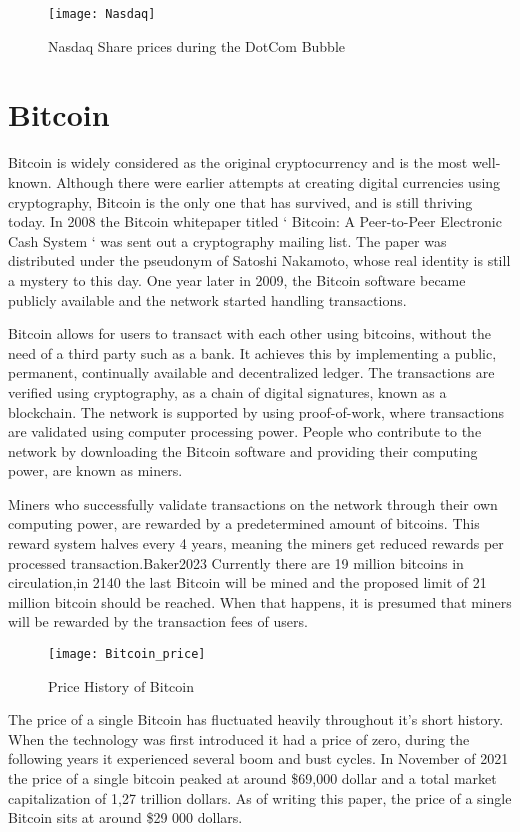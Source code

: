 \begin{figure} [h]
\texttt{[image: Nasdaq]}
\caption{Nasdaq Share prices during the DotCom Bubble}
\autocite{Chisu2018}
\end{figure}

\section{Bitcoin} \bigbreak

Bitcoin is widely considered as the original cryptocurrency and is the most well-known. Although there were earlier attempts at creating digital currencies using cryptography, Bitcoin is the only one that has survived, and is still thriving today. In 2008 the Bitcoin whitepaper titled ‘ Bitcoin: A Peer-to-Peer Electronic Cash System ‘ was sent out a cryptography mailing list. The paper was distributed under the pseudonym of Satoshi Nakamoto, whose real identity is still a mystery to this day. One year later in 2009, the Bitcoin software became publicly available and the network started handling transactions. \autocite{Marr2017} \bigbreak

Bitcoin allows for users to transact with each other using bitcoins, without the need of a third party such as a bank. It achieves this by implementing a public, permanent, continually available and decentralized ledger. The transactions are verified using cryptography, as a chain of digital signatures, known as a blockchain. The network is supported by using proof-of-work, where transactions are validated using computer processing power.\autocite{Nakamoto2008} People who contribute to the network by downloading the Bitcoin software and providing their computing power, are known as miners.  \autocite{Baker2023} \bigbreak

Miners who successfully validate transactions on the network through their own computing power, are rewarded by a predetermined amount of bitcoins. This reward system halves every 4 years, meaning the miners get reduced rewards per processed transaction.{Baker2023} Currently there are 19 million bitcoins in circulation,in 2140 the last Bitcoin will be mined and the proposed limit of 21 million bitcoin should be reached. When that happens, it is presumed that miners will be rewarded by  the transaction fees of users. \autocite{Lewis2018b} \bigbreak
\begin{figure} [h]
    \centering
    \texttt{[image: Bitcoin\_price]}
    \caption{Price History of Bitcoin}
    \autocite{Edwards2023}
\end{figure}
\bigbreak
The price of a single Bitcoin has fluctuated heavily throughout it’s short history. When the technology was first introduced it had a price of zero, during the following years it experienced several boom and bust cycles. In November of 2021 the price of a single bitcoin peaked at around \$69,000 dollar and a total market capitalization of 1,27 trillion dollars. As of writing this paper, the price of a single Bitcoin sits at around \$29 000 dollars. \autocite{Edwards2023} \bigbreak

